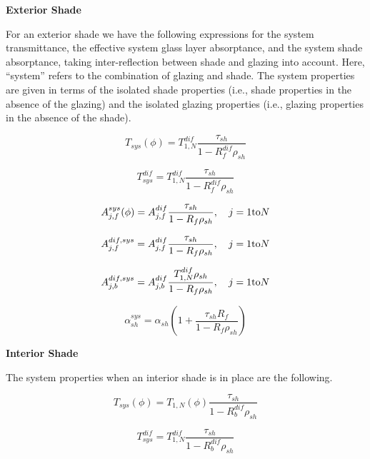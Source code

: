 \textbf{Exterior Shade}

For an exterior shade we have the following expressions for the system transmittance, the effective system glass layer absorptance, and the system shade absorptance, taking inter-reflection between shade and glazing into account. Here, ``system'' refers to the combination of glazing and shade. The system properties are given in terms of the isolated shade properties (i.e., shade properties in the absence of the glazing) and the isolated glazing properties (i.e., glazing properties in the absence of the shade).

\begin{equation}
{T_{sys}}(\phi ) = T_{1,N}^{dif}\frac{{{\tau_{sh}}}}{{1 - R_f^{dif}{\rho_{sh}}}}
\end{equation}

\begin{equation}
T_{sys}^{dif} = T_{1,N}^{dif}\frac{{{\tau_{sh}}}}{{1 - R_f^{dif}{\rho_{sh}}}}
\end{equation}

\begin{equation}
A_{j,f}^{sys}(\phi ) = A_{j,f}^{dif}\frac{{{\tau_{sh}}}}{{1 - {R_f}{\rho_{sh}}}},\quad j = 1{\rm{to}}N
\end{equation}

\begin{equation}
A_{j,f}^{dif,sys} = A_{j,f}^{dif}\frac{{{\tau_{sh}}}}{{1 - {R_f}{\rho_{sh}}}},\quad j = 1{\rm{ to }}N
\end{equation}

\begin{equation}
A_{j,b}^{dif,sys} = A_{j,b}^{dif}\frac{{T_{1,N}^{dif}{\rho_{sh}}}}{{1 - {R_f}{\rho_{sh}}}},\quad j = 1{\rm{ to }}N
\end{equation}

\begin{equation}
\alpha_{sh}^{sys} = {\alpha_{sh}}\left( {1 + \frac{{{\tau_{sh}}{R_f}}}{{1 - {R_f}{\rho_{sh}}}}} \right)
\end{equation}

\textbf{Interior Shade}

The system properties when an interior shade is in place are the following.

\begin{equation}
{T_{sys}}(\phi ) = T_{1,N}^{}(\phi )\frac{{{\tau_{sh}}}}{{1 - R_b^{dif}{\rho_{sh}}}}
\end{equation}

\begin{equation}
T_{sys}^{dif} = T_{1,N}^{dif}\frac{{{\tau_{sh}}}}{{1 - R_b^{dif}{\rho_{sh}}}}
\end{equation}

